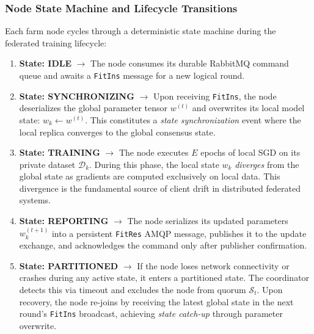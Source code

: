 \documentclass[applsci,article,submit,oneauthor,pdftex]{Definitions/mdpi}
\begin{document}
\subsubsection{Node State Machine and Lifecycle Transitions}
Each farm node cycles through a deterministic state machine during the federated training lifecycle:
\begin{enumerate}[leftmargin=*]
    \item \textbf{State: IDLE} $\to$ The node consumes its durable RabbitMQ command queue and awaits a \texttt{FitIns} message for a new logical round.
    \item \textbf{State: SYNCHRONIZING} $\to$ Upon receiving \texttt{FitIns}, the node deserializes the global parameter tensor $w^{(t)}$ and overwrites its local model state: $w_k \leftarrow w^{(t)}$. This constitutes a \textit{state synchronization} event where the local replica converges to the global consensus state.
    \item \textbf{State: TRAINING} $\to$ The node executes $E$ epochs of local SGD on its private dataset $\mathcal{D}_k$. During this phase, the local state $w_k$ \textit{diverges} from the global state as gradients are computed exclusively on local data. This divergence is the fundamental source of client drift in distributed federated systems.
    \item \textbf{State: REPORTING} $\to$ The node serializes its updated parameters $w_k^{(t+1)}$ into a persistent \texttt{FitRes} AMQP message, publishes it to the update exchange, and acknowledges the command only after publisher confirmation.
    \item \textbf{State: PARTITIONED} $\to$ If the node loses network connectivity or crashes during any active state, it enters a partitioned state. The coordinator detects this via timeout and excludes the node from quorum $\mathcal{S}_t$. Upon recovery, the node re-joins by receiving the latest global state in the next round's \texttt{FitIns} broadcast, achieving \textit{state catch-up} through parameter overwrite.
\end{enumerate}
\end{document}
